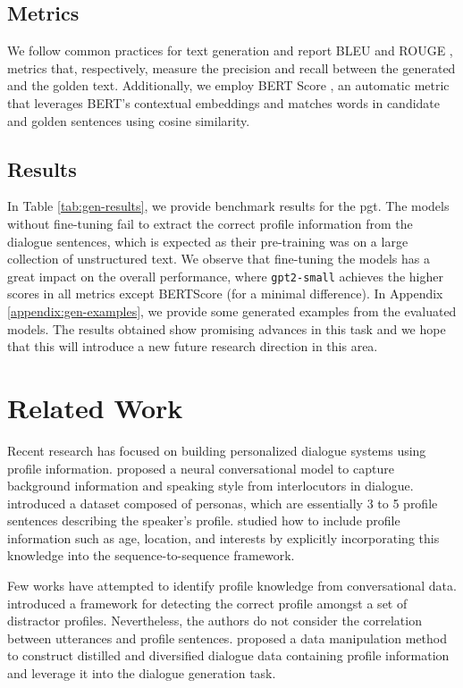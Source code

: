 \documentclass[11pt]{article}
\begin{document}
\subsection{Metrics}

We follow common practices for text generation and report BLEU \cite{BLEU} and ROUGE \cite{ROUGE}, metrics that, respectively, measure the precision and recall between the generated and the golden text.
Additionally, we employ BERT Score \cite{BERT-SCORE}, an automatic metric that leverages BERT's \cite{BERT} contextual embeddings and matches words in candidate and golden sentences using cosine similarity.

\subsection{Results}
\label{sec:results}
In Table \ref{tab:gen-results}, we provide benchmark results for the \gls*{pgt}.
The models without fine-tuning fail to extract the correct profile information from the dialogue sentences, which is expected as their pre-training was on a large collection of unstructured text.
We observe that fine-tuning the models has a great impact on the overall performance, where \texttt{gpt2-small} achieves the higher scores in all metrics except BERTScore (for a minimal difference).
In Appendix \ref{appendix:gen-examples}, we provide some generated examples from the evaluated models.
The results obtained show promising advances in this task and we hope that this will introduce a new future research direction in this area.

\section{Related Work}

Recent research has focused on building personalized dialogue systems using profile information.
\citet{PERSONA-NEURAL} proposed a neural conversational model to capture background information and speaking style from interlocutors in dialogue.
\citet{PERSONACHAT} introduced a dataset composed of personas, which are essentially 3 to 5 profile sentences describing the speaker's profile.
\citet{PERSONALIZED-TRAITS} studied how to include profile information such as age, location, and interests by explicitly incorporating this knowledge into the sequence-to-sequence framework.

Few works have attempted to identify profile knowledge from conversational data.
\cite{DETECT-SPEAKER} introduced a framework for detecting the correct profile amongst a set of distractor profiles.
Nevertheless, the authors do not consider the correlation between utterances and profile sentences.
\cite{DATA-MANIPULATION-PERSONA} proposed a data manipulation method to construct distilled and diversified dialogue data containing profile information and leverage it into the dialogue generation task.
\end{document}
